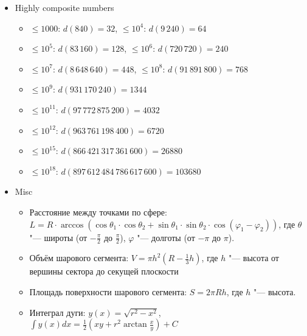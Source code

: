 \begin{itemize}
\item Highly composite numbers
\begin{itemize}
\item $\le 1000$: $d(840)=32$, $\le 10^4$: $d(9\,240)=64$
\item $\le 10^5$: $d(83\,160)=128$, $\le 10^6$: $d(720\,720)=240$
\item $\le 10^7$: $d(8\,648\,640)=448$, $\le 10^8$: $d(91\,891\,800)=768$
\item $\le 10^9$: $d(931\,170\,240)=1344$
\item $\le 10^{11}$: $d(97\,772\,875\,200)=4032$
\item $\le 10^{12}$: $d(963\,761\,198\,400)=6720$
\item $\le 10^{15}$: $d(866\,421\,317\,361\,600)=26880$
\item $\le 10^{18}$: $d(897\,612\,484\,786\,617\,600)=103680$
\end{itemize}

\item Misc
\begin{itemize}
\item Расстояние между точками по сфере: $L = R \cdot \arccos ( \cos \theta_1 \cdot \cos \theta_2 + \sin \theta_1 \cdot \sin \theta_2 \cdot \cos (\varphi_1 - \varphi_2) )$,
      где $\theta$ "--- широты (от $-\frac \pi 2$ до $\frac \pi 2$), $\varphi$ "--- долготы (от $-\pi$ до $\pi$).
\item Объём шарового сегмента: $V = \pi h^2 (R - \frac 1 3 h)$, где $h$ "--- высота от вершины сектора до секущей плоскости
\item Площадь поверхности шарового сегмента: $S=2\pi R h$, где $h$ "--- высота.
\item Интеграл дуги: $y(x)=\sqrt{r^2 - x^2}$, $\int y(x) dx = \frac{1}{2} (xy + r^2 \arctan \frac{x}{y}) + C$
\end{itemize}


\end{itemize}
